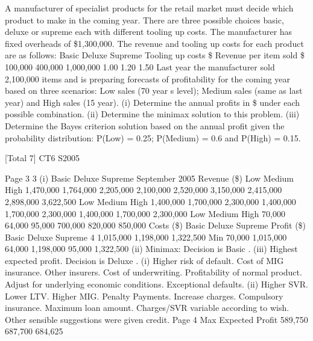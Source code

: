 \documentclass[a4paper,12pt]{article}
\begin{document}
 


A manufacturer of specialist products for the retail market must decide which product
to make in the coming year. There are three possible choices basic, deluxe or
supreme
each with different tooling up costs. The manufacturer has fixed
overheads of \$1,300,000.
The revenue and tooling up costs for each product are as follows:
Basic
Deluxe
Supreme
Tooling up costs
\$ Revenue per item sold
\$
100,000
400,000
1,000,000 1.00
1.20
1.50
Last year the manufacturer sold 2,100,000 items and is preparing forecasts of
profitability for the coming year based on three scenarios: Low sales (70%
year s level); Medium sales (same as last year) and High sales (15%
year).
(i) Determine the annual profits in \$ under each possible combination. 
(ii) Determine the minimax solution to this problem. 
(iii) Determine the Bayes criterion solution based on the annual profit given the
probability distribution: P(Low) = 0.25; P(Medium) = 0.6 and P(High) = 0.15.

[Total 7]
CT6 S2005


Page 3%
3
(i)
Basic
Deluxe
Supreme
September 2005
Revenue (\$)
Low Medium High
1,470,000
1,764,000
2,205,000 2,100,000
2,520,000
3,150,000 2,415,000
2,898,000
3,622,500
Low Medium High
1,400,000
1,700,000
2,300,000 1,400,000
1,700,000
2,300,000 1,400,000
1,700,000
2,300,000
Low Medium High
70,000
64,000
95,000 700,000
820,000
850,000
Costs (\$)
Basic
Deluxe
Supreme
Profit (\$)
Basic
Deluxe
Supreme
4
1,015,000
1,198,000
1,322,500
Min
70,000 1,015,000
64,000 1,198,000
95,000 1,322,500
(ii) Minimax: Decision is Basic .
(iii) Highest expected profit. Decision is Deluxe .
(i) Higher risk of default.
Cost of MIG insurance.
Other insurers.
Cost of underwriting.
Profitability of normal product.
Adjust for underlying economic conditions.
Exceptional defaults.
(ii) Higher SVR.
Lower LTV.
Higher MIG.
Penalty Payments.
Increase charges.
Compulsory insurance.
Maximum loan amount.
Charges/SVR variable according to wish.
Other sensible suggestions were given credit.
Page 4
Max
Expected
Profit
589,750
687,700
684,625%
\end{document}
